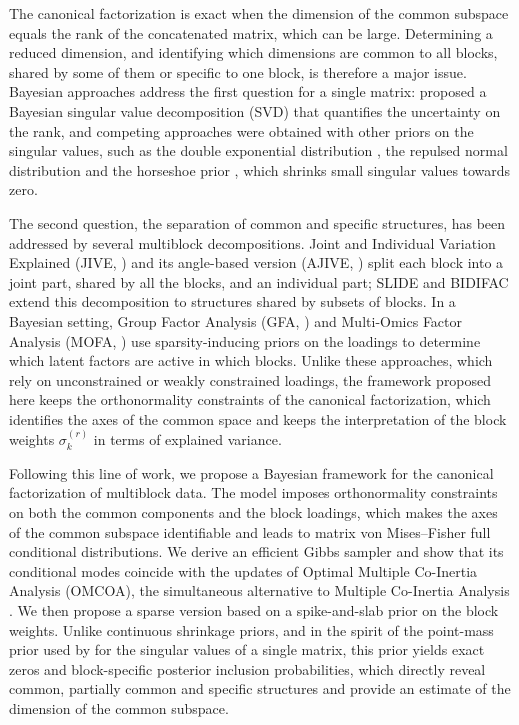 \documentclass[11pt]{article}
\begin{document}
The canonical factorization is exact when the dimension of the common subspace equals the rank of the concatenated matrix, which can be large. Determining a reduced dimension, and identifying which dimensions are common to all blocks, shared by some of them or specific to one block, is therefore a major issue. Bayesian approaches address the first question for a single matrix: \cite{hoff2007} proposed a Bayesian singular value decomposition (SVD) that quantifies the uncertainty on the rank, and competing approaches were obtained with other priors on the singular values, such as the
double exponential distribution \cite{zhai2023}, the repulsed normal distribution \cite{yuchi2023} and the horseshoe prior \cite{wang2026}, which shrinks small singular values towards zero.

The second question, the separation of common and specific structures, has been addressed by several multiblock decompositions. Joint and Individual Variation Explained (JIVE, \cite{lock2013}) and its angle-based version (AJIVE, \cite{feng2018}) split each block into a joint part, shared by all the blocks, and an individual part; SLIDE \cite{gaynanova2019} and BIDIFAC \cite{park2020} extend this decomposition to structures shared by subsets of blocks. In a Bayesian setting, Group Factor Analysis (GFA, \cite{klami2015}) and Multi-Omics Factor Analysis (MOFA, \cite{argelaguet2018}) use sparsity-inducing priors on the loadings to determine which latent factors are active in which blocks. Unlike these approaches, which rely on unconstrained or weakly constrained loadings, the framework proposed here keeps the orthonormality constraints of the canonical factorization, which identifies the axes of the common space and keeps the interpretation of the block weights $\sigma_k^{(r)}$ in terms of explained variance.

Following this line of work, we propose a Bayesian framework for the canonical factorization of multiblock data. The model imposes orthonormality constraints on both the common components and the block loadings, which makes the axes of the common subspace identifiable and leads to matrix von Mises--Fisher full conditional distributions. We derive an efficient Gibbs sampler and show that its conditional modes coincide with the updates of Optimal Multiple Co-Inertia Analysis (OMCOA), the simultaneous alternative to Multiple Co-Inertia Analysis \cite{chessel1996}. We then propose a sparse
version based on a spike-and-slab prior \cite{mitchell1988,george1993} on the block weights. Unlike continuous shrinkage priors, and in the spirit of the point-mass prior used by \cite{hoff2007} for the singular values of a single matrix, this prior yields exact zeros and block-specific posterior inclusion probabilities, which directly reveal common, partially common and specific structures and provide an estimate of the dimension of the common subspace.  
\end{document}

